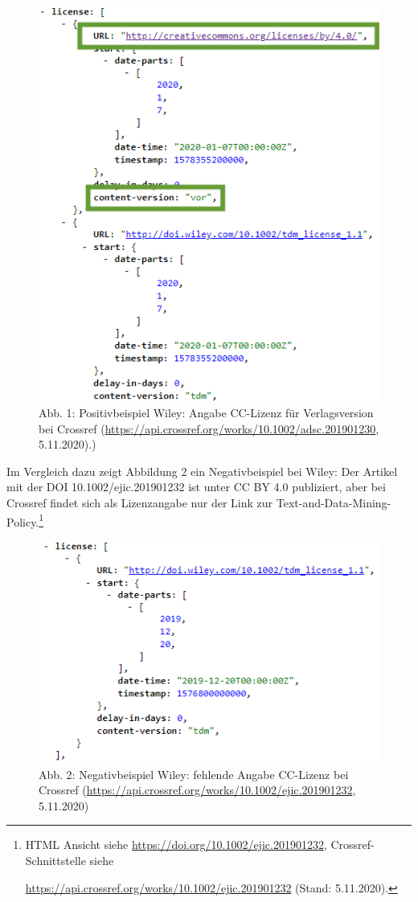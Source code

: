 \documentclass[a4paper,
fontsize=11pt,
oneside,
numbers=noperiodatend,
parskip=half-,
bibliography=totoc,
final
]{scrartcl}
\begin{document}
\begin{figure}
\centering
\includegraphics{img/CRwileyPOS.png}
\caption{Abb. 1: Positivbeispiel Wiley: Angabe CC-Lizenz für
Verlagsversion bei Crossref
(\url{https://api.crossref.org/works/10.1002/adsc.201901230},
5.11.2020).)}
\end{figure}

Im Vergleich dazu zeigt Abbildung 2 ein Negativbeispiel bei Wiley: Der
Artikel mit der DOI 10.1002/ejic.201901232 ist unter CC BY 4.0
publiziert, aber bei Crossref findet sich als Lizenzangabe nur der Link
zur Text-and-Data-Mining-Policy.\footnote{HTML Ansicht siehe
  \url{https://doi.org/10.1002/ejic.201901232}, Crossref-Schnittstelle
  siehe

  \url{https://api.crossref.org/works/10.1002/ejic.201901232} (Stand:
  5.11.2020).}

\begin{figure}
\centering
\includegraphics{img/CRwileyNEG.png}
\caption{Abb. 2: Negativbeispiel Wiley: fehlende Angabe CC-Lizenz bei
Crossref (\url{https://api.crossref.org/works/10.1002/ejic.201901232},
5.11.2020)}
\end{figure}
\end{document}
